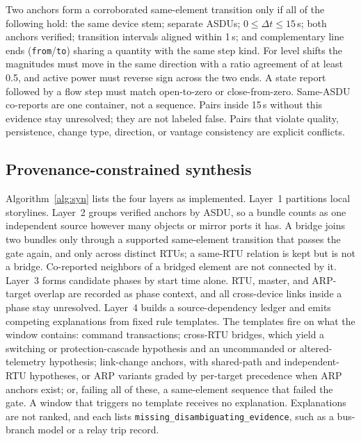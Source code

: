 \documentclass[conference]{IEEEtran}
\begin{document}
Two anchors form a corroborated same-element transition only if all of the following hold: the same device stem; separate ASDUs; $0\le\Delta t\le 15$\,s; both anchors verified; transition intervals aligned within 1\,s; and complementary line ends (\texttt{from}/\texttt{to}) sharing a quantity with the same step kind.
For level shifts the magnitudes must move in the same direction with a ratio agreement of at least 0.5, and active power must reverse sign across the two ends.
A state report followed by a flow step must match open-to-zero or close-from-zero.
Same-ASDU co-reports are one container, not a sequence.
Pairs inside 15\,s without this evidence stay unresolved; they are not labeled false.
Pairs that violate quality, persistence, change type, direction, or vantage consistency are explicit conflicts.

\subsection{Provenance-constrained synthesis}
Algorithm~\ref{alg:syn} lists the four layers as implemented.
Layer~1 partitions local storylines.
Layer~2 groups verified anchors by ASDU, so a bundle counts as one independent source however many objects or mirror ports it has.
A bridge joins two bundles only through a supported same-element transition that passes the gate again, and only across distinct RTUs; a same-RTU relation is kept but is not a bridge.
Co-reported neighbors of a bridged element are not connected by it.
Layer~3 forms candidate phases by start time alone.
RTU, master, and ARP-target overlap are recorded as phase context, and all cross-device links inside a phase stay unresolved.
Layer~4 builds a source-dependency ledger and emits competing explanations from fixed rule templates.
The templates fire on what the window contains: command transactions; cross-RTU bridges, which yield a switching or protection-cascade hypothesis and an uncommanded or altered-telemetry hypothesis; link-change anchors, with shared-path and independent-RTU hypotheses, or ARP variants graded by per-target precedence when ARP anchors exist; or, failing all of these, a same-element sequence that failed the gate.
A window that triggers no template receives no explanation.
Explanations are not ranked, and each lists \texttt{missing\_disambiguating\_evidence}, such as a bus-branch model or a relay trip record.
\end{document}
